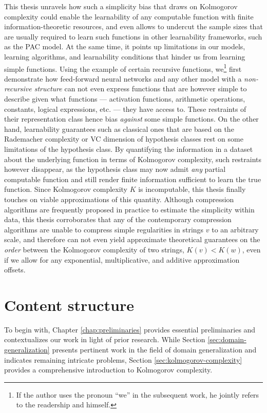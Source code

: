 This thesis unravels how such a simplicity bias that draws on Kolmogorov complexity could enable the learnability of any computable function with finite information-theoretic resources, and even allows to undercut the sample sizes that are usually required to learn such functions in other learnability frameworks, such as the PAC model.
At the same time, it points up limitations in our models, learning algorithms, and learnability conditions that hinder us from learning simple functions.
Using the example of certain recursive functions, we\footnote{If the author uses the pronoun ``we'' in the subsequent work, he jointly refers to the readership and himself.} first demonstrate how feed-forward neural networks and any other model with a \textit{non-recursive structure} can not even express functions that are however simple to describe given what functions --- activation functions, arithmetic operations, constants, logical expressions, etc. --- they have access to.
These restraints of their representation class hence bias \textit{against} some simple functions.
On the other hand, learnability guarantees such as classical ones that are based on the Rademacher complexity or VC dimension of hypothesis classes rest on some limitations of the hypothesis class.
By quantifying the information in a dataset about the underlying function in terms of Kolmogorov complexity, such restraints however disappear, as the hypothesis class may now admit \textit{any} partial computable function and still render finite information sufficient to learn the true function.
Since Kolmogorov complexity $K$ is incomputable, this thesis finally touches on viable approximations of this quantity.
Although compression algorithms are frequently proposed in practice to estimate the simplicity within data, this thesis corroborates that any of the contemporary compression algorithms are unable to compress simple regularities in strings $v$ to an arbitrary scale, and therefore can not even yield approximate theoretical guarantees on the \textit{order} between the Kolmogorov complexity of two strings, $K(v)<K(w)$, even if we allow for any exponential, multiplicative, and additive approximation offsets.

\section{Content structure}
To begin with, Chapter \ref{chap:preliminaries} provides essential preliminaries and contextualizes our work in light of prior research. 
While Section \ref{sec:domain-generalization} presents pertinent work in the field of domain generalization and indicates remaining intricate problems, Section \ref{sec:kolmogorov-complexity} provides a comprehensive introduction to Kolmogorov complexity.


